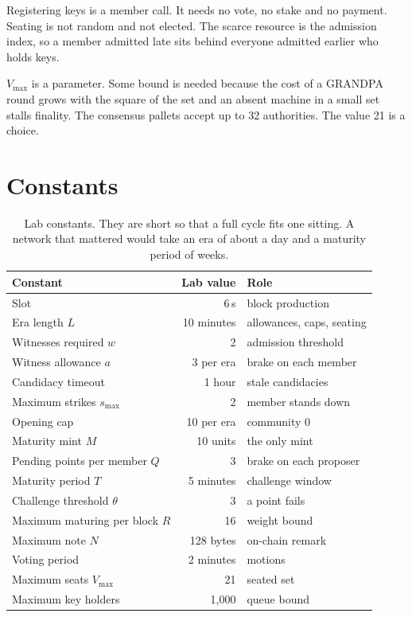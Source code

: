 \documentclass[11pt,a4paper]{article}
\theoremstyle{definition}
\theoremstyle{plain}
\theoremstyle{remark}
\begin{document}
Registering keys is a member call. It needs no vote, no stake and no payment. Seating is not random and not elected. The scarce resource is the admission index, so a member admitted late sits behind everyone admitted earlier who holds keys.

$V_{\max}$ is a parameter. Some bound is needed because the cost of a GRANDPA round grows with the square of the set and an absent machine in a small set stalls finality. The consensus pallets accept up to 32 authorities. The value 21 is a choice.

\section{Constants}
\label{sec:constants}

\begin{table}[h]
\centering
\caption{Lab constants. They are short so that a full cycle fits one sitting. A network that mattered would take an era of about a day and a maturity period of weeks.}
\label{tab:constants}
\begin{tabular}{@{}lrl@{}}
\toprule
Constant & Lab value & Role \\
\midrule
Slot & 6\,s & block production \\
Era length $L$ & 10 minutes & allowances, caps, seating \\
Witnesses required $w$ & 2 & admission threshold \\
Witness allowance $a$ & 3 per era & brake on each member \\
Candidacy timeout & 1 hour & stale candidacies \\
Maximum strikes $s_{\max}$ & 2 & member stands down \\
Opening cap & 10 per era & community 0 \\
Maturity mint $M$ & 10 units & the only mint \\
Pending points per member $Q$ & 3 & brake on each proposer \\
Maturity period $T$ & 5 minutes & challenge window \\
Challenge threshold $\theta$ & 3 & a point fails \\
Maximum maturing per block $R$ & 16 & weight bound \\
Maximum note $N$ & 128 bytes & on-chain remark \\
Voting period & 2 minutes & motions \\
Maximum seats $V_{\max}$ & 21 & seated set \\
Maximum key holders & 1{,}000 & queue bound \\
\bottomrule
\end{tabular}
\end{table}
\end{document}
